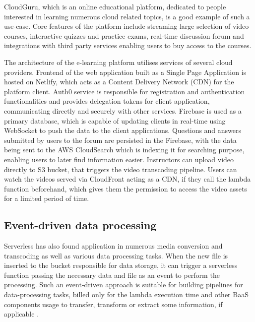 CloudGuru, which is an online educational platform, dedicated to people interested in learning numerous cloud related topics, is a good example of such a use-case. Core features of the platform include streaming large selection of video courses, interactive quizzes and practice exams, real-time discussion forum and integrations with third party services enabling users to buy access to the courses.

The architecture of the e-learning platform utilises services of several cloud providers. Frontend of the web application built as a Single Page Application is hosted on Netlify, which acts as a Content Delivery Network (CDN) for the platform client. Auth0 service is responsible for registration and authentication functionalities and provides delegation tokens for client application, communicating directly and securely with other services. Firebase is used as a primary database, which is capable of updating clients in real-time using WebSocket to push the data to the client applications. Questions and answers submitted by users to the forum are persisted in the Firebase, with the data being sent to the AWS CloudSearch which is indexing it for searching purpose, enabling users to later find information easier. Instructors can upload video directly to S3 bucket, that triggers the video transcoding pipeline. Users can watch the videos served via CloudFront acting as a CDN, if they call the lambda function beforehand, which gives them the permission to access the video assets for a limited period of time.

\subsection{Event-driven data processing} \label{chapter:serverless-example-event-drive-processing}


Serverless has also found application in numerous media conversion and transcoding as well as various data processing tasks. When the new file is inserted to the bucket responsible for data storage, it can trigger a serverless function passing the necessary data and file as an event to perform the processing. Such an event-driven approach is suitable for building pipelines for data-processing tasks, billed only for the lambda execution time and other BaaS components usage to transfer, transform or extract some information, if applicable \cite{ServerlessArchitectureOnAWS}.

